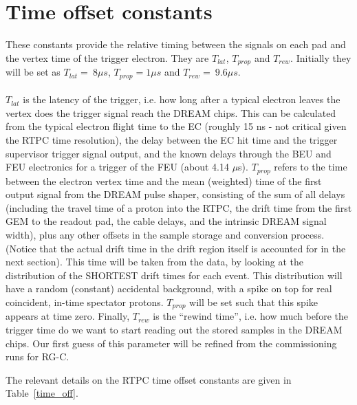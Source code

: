 \documentclass[12pt]{article}
\begin{document}
   \section {Time offset constants}
 These constants provide the relative timing between the signals on each pad 
 and the vertex time of the trigger electron. They are $T_{lat}$, $T_{prop}$ 
 and $T_{rew}$. Initially they will be set as $T_{lat}=~8\mu s$, $T_{prop} = 1 
 \mu s$ and $T_{rew}=~9.6\mu s$.
~\\
~\\
$T_{lat}$ is the latency of the trigger, i.e. how long after a typical electron 
leaves the vertex does the trigger signal 
reach the DREAM chips. This can be calculated from the typical electron flight time to the EC
(roughly 15 ns - not critical given the RTPC time resolution), the delay between the EC hit time
and the trigger supervisor trigger signal output, and the known delays through the BEU and FEU
electronics for a trigger of the FEU (about 4.14 $\mu$s).
$T_{prop}$ refers to the time between the electron vertex time and the mean (weighted) time of the first output signal from the DREAM pulse shaper, consisting of the sum of all delays (including the
travel time of a proton into the RTPC, 
the drift time from the first GEM to the readout pad, the cable delays, and the intrinsic DREAM signal width), plus any other offsets
in the sample storage and conversion process. (Notice that the actual drift time in the drift region
itself is accounted for in the next section).
This time will be taken from the data, by looking at the
distribution of the SHORTEST drift times for each event. This distribution will have a random (constant) accidental
background, with a spike on top for real coincident, in-time spectator protons. $T_{prop}$ will be set such
that this spike appears at time zero.
Finally, $T_{rew}$ is the ``rewind time'', i.e. how much before the trigger time do we 
want to start reading out the stored samples in the DREAM chips. Our first 
guess of this parameter will be refined from the commissioning runs for RG-C. 

The relevant details on the RTPC time offset constants are given in 
Table~\ref{time_off}.
\end{document}
